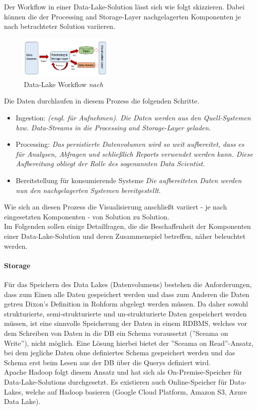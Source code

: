 \documentclass[twoside,twocolumn]{article}
\begin{document}
Der Workflow in einer Data-Lake-Solution lässt sich wie folgt skizzieren. Dabei können die der Processing and Storage-Layer nachgelagerten Komponenten je nach betrachteter Solution variieren.

\begin{figure}[h]
	\centering 
	\includegraphics[width=0.4\textwidth]{img/p4} 
	\caption{Data-Lake Workflow \textit{nach} \cite{src9}}	
\end{figure}

Die Daten durchlaufen in diesem Prozess die folgenden Schritte.
\begin{itemize}
	\item Ingestion: \textit{(engl. für Aufnehmen). Die Daten werden aus den Quell-Systemen bzw. Data-Streams in die Processing and Storage-Layer geladen.}
	\item Processing: \textit{Das persistierte Datenvolumen wird so weit aufbereitet, dass es für Analysen, Abfragen und schließlich Reports verwendet werden kann. Diese Aufbereitung obliegt der Rolle des sogenannten Data Scientist.\cite{src8}} 
	\item Bereitstellung für konsumierende Systeme \textit{Die aufbereiteten Daten werden nun den nachgelagerten Systemen bereitgestellt.}
\end{itemize}
Wie sich an diesen Prozess die Visualisierung anschließt variiert - je nach eingesetzten Komponenten - von Solution zu Solution.\\

Im Folgenden sollen einige Detailfragen, die die Beschaffenheit der Komponenten einer Data-Lake-Solution und deren Zusammenspiel betreffen, näher beleuchtet werden.

\paragraph{Storage}
		Für das Speichern des Data Lakes (Datenvolumens) bestehen die Anforderungen, dass zum Einen alle Daten gespeichert werden und dass zum Anderen die Daten getreu Dixon's Definition in Rohform abgelegt werden müssen. Da daher sowohl strukturierte, semi-strukturierte und un-strukturierte Daten gespeichert werden müssen, ist eine sinnvolle Speicherung der Daten in einem RDBMS, welches vor dem Schreiben von Daten in die DB ein Schema voraussetzt (''Sceama on Write''), nicht möglich. Eine Lösung hierbei bietet der ''Sceama on Read''-Ansatz, bei dem jegliche Daten ohne definiertes Schema gespeichert werden und das Schema erst beim Lesen aus der DB über die Querys definiert wird.\\
		Apache Hadoop folgt diesem Ansatz und hat sich als On-Premise-Speicher für Data-Lake-Solutions durchgesetzt. Es existieren auch Online-Speicher für Data-Lakes, welche auf Hadoop basieren (Google Cloud Platform, Amazon S3, Azure Data Lake).
		\cite{src8}
\end{document}
